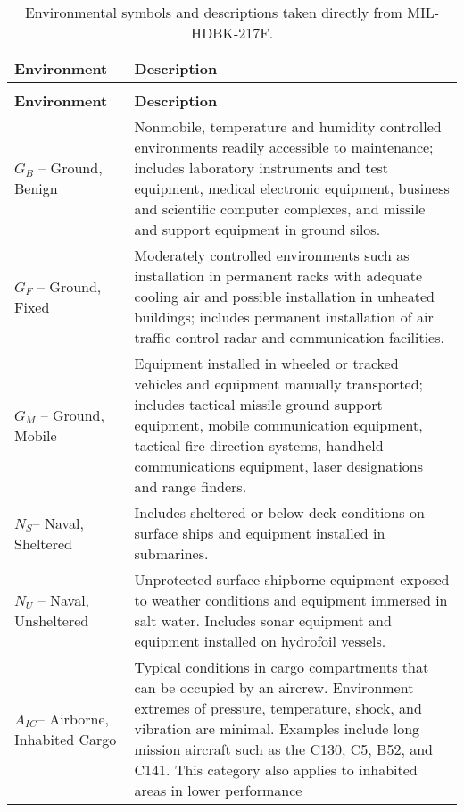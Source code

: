 \footnotesize
\begin{longtable}{|m{4cm}|m{10cm}|}
\caption{Environmental symbols and descriptions taken directly from MIL-HDBK-217F.} 
\label{table:envSymbols}\\


\hline
\rowcolor{Gray}
\textbf{Environment} &  \textbf{Description}  \\ \hline
\endfirsthead

\hline
\rowcolor{Gray}
\multicolumn{2}{l}{{{\bfseries \tablename\ \thetable{} -- continued from previous page}}} \\ \hline
\rowcolor{Gray}
\textbf{Environment} &  \textbf{Description}  \\ \hline
\endhead
\endfoot

\hline
$G_{B}$ -- Ground, Benign & Nonmobile, temperature and
humidity controlled environments readily accessible to maintenance;
includes laboratory instruments and test equipment, medical electronic
equipment, business and scientific computer complexes, and missile and
support equipment in ground silos. \\ \hline
$G_{F}$ -- Ground, Fixed & Moderately controlled environments
such as installation in permanent racks with adequate cooling air and
possible installation in unheated buildings; includes permanent
installation of air traffic control radar and communication
facilities. \\ \hline
$G_{M}$ -- Ground, Mobile & Equipment installed in wheeled or
tracked vehicles and equipment manually transported; includes tactical
missile ground support equipment, mobile communication equipment,
tactical fire direction systems, handheld communications equipment,
laser designations and range finders. \\ \hline
$N_{S}$-- Naval, Sheltered & Includes sheltered or below
deck conditions on surface ships and equipment installed in
submarines. \\ \hline
$N_{U}$ -- Naval, Unsheltered & Unprotected surface shipborne
equipment exposed to weather conditions and equipment immersed in salt
water. Includes sonar equipment and equipment installed on hydrofoil
vessels. \\ \hline
$A_{IC}$-- Airborne, Inhabited Cargo & Typical conditions in
cargo compartments that can be occupied by an aircrew. Environment
extremes of pressure, temperature, shock, and vibration are minimal.
Examples include long mission aircraft such as the C130, C5, B52, and
C141. This category also applies to inhabited areas in lower performance

\end{longtable}
